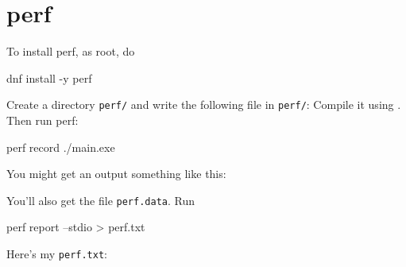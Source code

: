 \section{perf}

To install perf, as root, do
\begin{console}[fontsize=\footnotesize]
dnf install -y perf
\end{console}

Create a directory \verb!perf/! and write the following file
in \verb!perf/!:
Compile it using \gpp.
Then run perf:
\begin{console}[fontsize=\footnotesize]
perf record ./main.exe
\end{console}
You might get an output something like this:
\begin{console}
\end{console}
You'll also get the file \verb!perf.data!.
Run
\begin{console}[fontsize=\footnotesize]
perf report --stdio > perf.txt
\end{console}
Here's my \verb!perf.txt!:
